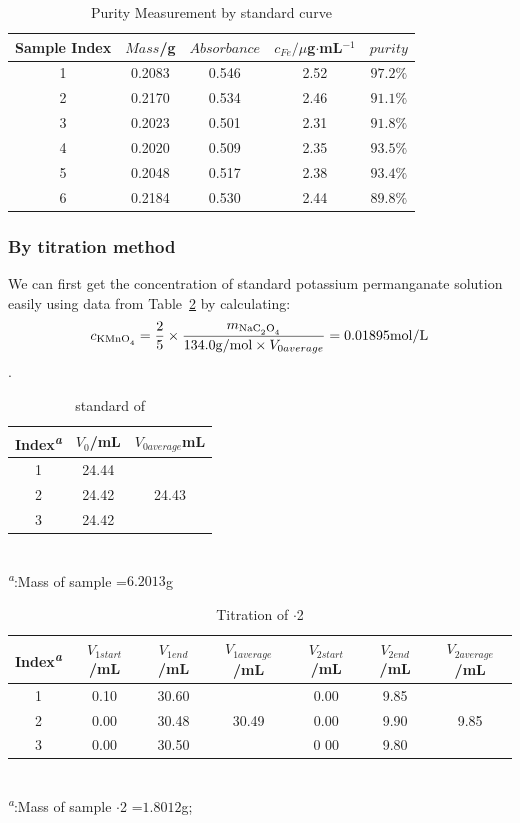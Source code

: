 \begin{table}[H]
	\caption{Purity Measurement by standard curve}
	\label{tab.Pcurve}
	\begin{tabular}{ccccc}
	\toprule
	Sample Index  &$Mass$/g & $Absorbance$ &$c_{Fe}/\mu$g$\cdot$mL$^{-1}$& $purity$   \\
	\midrule
	1		&0.2083 & 0.546      & 2.52   &$97.2\%$  \\
	2		&0.2170 & 0.534      & 2.46   &$91.1\%$  \\
	3		&0.2023 & 0.501      & 2.31   &$91.8\%$  \\
	4		&0.2020 & 0.509      & 2.35   &$93.5\%$  \\
	5		&0.2048 & 0.517      & 2.38   &$93.4\%$  \\
	6		&0.2184 & 0.530      & 2.44   &$89.8\%$  \\
	\bottomrule
	\end{tabular}
\end{table}

\subsubsection{By titration method}

We can first get the concentration of standard potassium permanganate solution easily using data from Table~\ref{tab.CalMn} by calculating: \[c_{\ce{KMnO4}}=\frac{2}{5}\times\frac{m_{\ce{NaC2O4}}}{134.0{\rm g/mol}\times V_{0average}}=0.01895{\rm mol/L}\].

\begin{table}[H]
	\caption{standard of }
	\label{tab.CalMn}
	\begin{tabular}{ccc}
	\toprule
	Index\textsuperscript{\emph{a}}&$V_0$/mL&$V_{0average}$mL\\
	\midrule
	1    & 24.44 &\\
	2    & 24.42 & 24.43\\
	3    & 24.42 &\\
	\bottomrule
	\end{tabular}\\
	\textsuperscript{\emph{a}}:Mass of sample =$6.2013$g
\end{table}

\begin{table}[H]
	\caption{Titration of $\cdot$2}
	\label{tab.Tit}
	\begin{tabular}{ccccccc}
	\toprule
	Index\textsuperscript{\emph{a}}&$V_{1start}$/mL&$V_{1end}$/mL&$V_{1average}$/mL&$V_{2start}$/mL& $V_{2end}$/mL&$V_{2average}$/mL\\
	\midrule
	1    & 0.10 & 30.60 &       & 0.00 & 9.85 &     \\
	2    & 0.00 & 30.48 & 30.49 & 0.00 & 9.90 & 9.85\\
	3    & 0.00 & 30.50 &       & 0 00 & 9.80 &     \\
	\bottomrule
	\end{tabular}\\
	\textsuperscript{\emph{a}}:Mass of sample $\cdot$2 =$1.8012$g;
\end{table}

